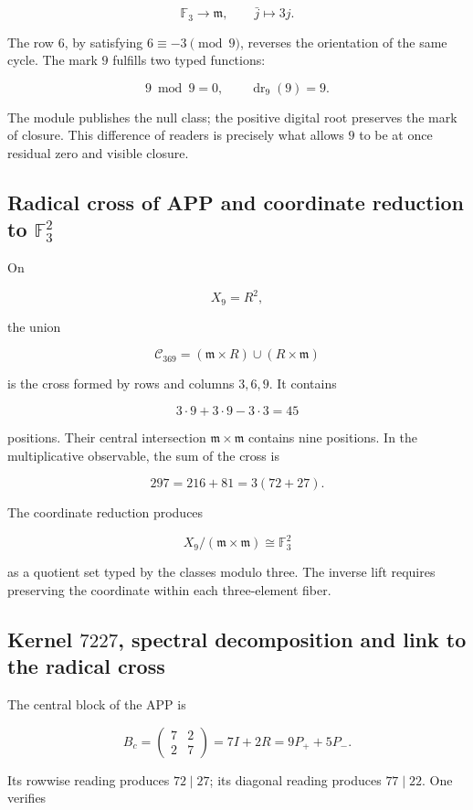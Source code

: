 \[
\mathbb F_3\longrightarrow\mathfrak m,
\qquad
\bar j\longmapsto3j.
\]

The row \(6\), by satisfying \(6\equiv-3\pmod9\), reverses the orientation
of the same cycle. The mark \(9\) fulfills two typed functions:

\[
9\bmod9=0,
\qquad
\operatorname{dr}_9(9)=9.
\]

The module publishes the null class; the positive digital root preserves the mark of closure. This difference of readers is precisely what allows \(9\) to be at once residual zero and visible closure.

\subsection{Radical cross of APP and coordinate reduction to \(\mathbb F_3^2\)}

On

\[
X_9=R^2,
\]

the union

\[
\mathscr C_{369}
=(\mathfrak m\times R)\cup(R\times\mathfrak m)
\]

is the cross formed by rows and columns \(3,6,9\). It contains

\[
3\cdot9+3\cdot9-3\cdot3=45
\]

positions. Their central intersection \(\mathfrak m\times\mathfrak m\) contains nine positions. In the multiplicative observable, the sum of the cross is

\[
297=216+81=3(72+27).
\]

The coordinate reduction produces

\[
X_9/(\mathfrak m\times\mathfrak m)\cong\mathbb F_3^2
\]

as a quotient set typed by the classes modulo three. The inverse lift requires preserving the coordinate within each three-element fiber.

\subsection{Kernel \(7227\), spectral decomposition and link to the radical cross}

The central block of the APP is

\[
B_c=
\begin{pmatrix}
7&2\\
2&7
\end{pmatrix}
=7I+2R
=9P_++5P_-.
\]

Its rowwise reading produces \(72\mid27\); its diagonal reading produces \(77\mid22\). One verifies

